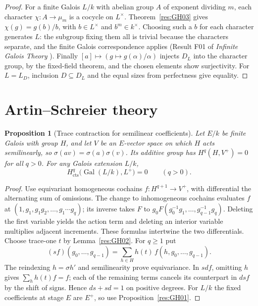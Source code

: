 \documentclass[11pt,oneside,openany]{book}
\newtheorem{proposition}[theorem]{Proposition}
\theoremstyle{definition}
\theoremstyle{remark}
\begin{document}
\begin{proof}
For a finite Galois \(L/k\) with abelian group \(A\) of exponent
dividing \(m\), each character \(\chi:A\to\mu_m\) is a cocycle on
\(L^\times\). Theorem~\ref{res:GH03} gives \(\chi(g)=g(b)/b\), with
\(b\in L^\times\) and \(b^m\in k^\times\). Choosing such a \(b\) for
each character generates \(L\): the subgroup fixing them all is
trivial because the characters separate, and the finite Galois
correspondence applies (Result F01 of \emph{Infinite Galois Theory}
\cite[PDF p.~4]{mg-aft}). Finally \([a]\mapsto(g\mapsto g(\alpha)/\alpha)\)
injects \(D_L\) into the character group, by the fixed-field theorem,
and the chosen elements show surjectivity. For \(L=L_D\), inclusion
\(D\subseteq D_L\) and the equal sizes from perfectness give equality.
\end{proof}

\section{Artin--Schreier theory}

\begin{proposition}[Trace contraction for semilinear coefficients]
\label{res:GH08}
Let \(E/k\) be finite Galois with group \(H\), and let \(V\) be an
\(E\)-vector space on which \(H\) acts semilinearly, so
\(\sigma(av)=\sigma(a)\sigma(v)\). Its additive group has
\(H^q(H,V^+)=0\) for all \(q>0\). For any Galois extension \(L/k\),
\[
 H^q_{\mathrm{cts}}\bigl(\operatorname{Gal}(L/k),L^+\bigr)=0
 \qquad(q>0).
\]
\end{proposition}
\begin{proof}
Use equivariant homogeneous cochains \(f:H^{q+1}\to V^+\),
with differential the alternating sum of omissions.
The change to inhomogeneous cochains evaluates \(f\) at
\((1,g_1,g_1g_2,\ldots,g_1\cdots g_q)\); its inverse takes
\(F\) to \(g_0 F(g_0^{-1}g_1,\ldots,g_{q-1}^{-1}g_q)\).
Deleting the first variable yields the action term and deleting
an interior variable multiplies adjacent increments. These formulas
intertwine the two differentials.
Choose trace-one \(t\) by Lemma~\ref{res:GH02}. For \(q\geq1\) put
\[
 (s f)(g_0,\ldots,g_{q-1})
   =\sum_{h\in H}h(t)\,f(h,g_0,\ldots,g_{q-1}).
\]
The reindexing \(h=\sigma h'\) and semilinearity prove
equivariance. In \(s d f\), omitting \(h\) gives
\(\sum_h h(t)f=f\); each of the remaining terms cancels its
counterpart in \(d s f\) by the shift of signs. Hence \(d s+s d=1\)
on positive degrees. For \(L/k\) the fixed coefficients at stage
\(E\) are \(E^+\), so use Proposition~\ref{res:GH01}.
\end{proof}
\end{document}
